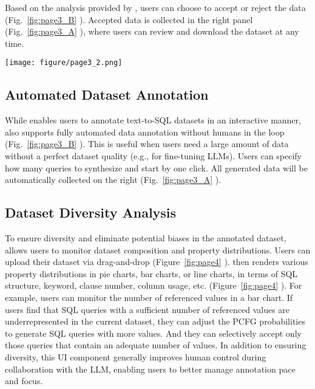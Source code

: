 Based on the analysis provided by {\tool}, users can choose to accept or reject the data (Fig.~\ref{fig:page3_B} ). Accepted data is collected in the right panel (Fig.~\ref{fig:page3_A} ), where users can review and download the dataset at any time.


\begin{figure*}[ht]
  \centering
  \texttt{[image: figure/page3\_2.png]}
  \caption{The user interface for post-synthesis analysis \& automated annotation. }
  \label{fig:page3_B}
\end{figure*}


\subsection{Automated Dataset Annotation}
While {\tool} enables users to annotate text-to-SQL datasets in an interactive manner, {\tool} also supports fully automated data annotation without humans in the loop (Fig.~\ref{fig:page3_B} ). This is useful when users need a large amount of data without a perfect dataset quality (e.g., for fine-tuning LLMs).
Users can specify how many queries to synthesize and start by one click.
All generated data will be automatically collected on the right (Fig.~\ref{fig:page3_A} ).

\subsection{Dataset Diversity Analysis}


To ensure diversity and eliminate potential biases in the annotated dataset, {\tool} allows users to monitor dataset composition and property distributions.
Users can upload their dataset via drag-and-drop (Figure~\ref{fig:page4} ). {\tool} then renders various property distributions in pie charts, bar charts, or line charts, in terms of SQL structure, keyword, clause number, column usage, etc. (Figure~\ref{fig:page4} ).
For example, users can monitor the number of referenced values in a bar chart.
If users find that SQL queries with a sufficient number of referenced values are underrepresented in the current dataset, they can adjust the PCFG probabilities to generate SQL queries with more values. And they can selectively accept only those queries that contain an adequate number of values.
In addition to ensuring diversity, this UI component generally improves human control during collaboration with the LLM, enabling users to better manage annotation pace and focus.


